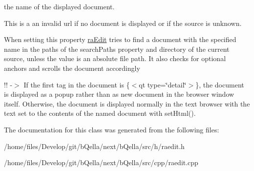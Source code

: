 the name of the displayed document. 

This is a an invalid url if no document is displayed or if the source is unknown.

When setting this property \hyperlink{classraEdit}{raEdit} tries to find a document with the specified name in the paths of the searchPaths property and directory of the current source, unless the value is an absolute file path. It also checks for optional anchors and scrolls the document accordingly

!! -\/$>$ If the first tag in the document is {\ttfamily }\{$<$qt type=\char`\"{}detail\char`\"{}$>$\}, the document is displayed as a popup rather than as new document in the browser window itself. Otherwise, the document is displayed normally in the text browser with the text set to the contents of the named document with setHtml(). 

The documentation for this class was generated from the following files:\begin{DoxyCompactItemize}
\item 
/home/files/Develop/git/bQella/next/bQella/src/h/raedit.h\item 
/home/files/Develop/git/bQella/next/bQella/src/cpp/raedit.cpp\end{DoxyCompactItemize}
